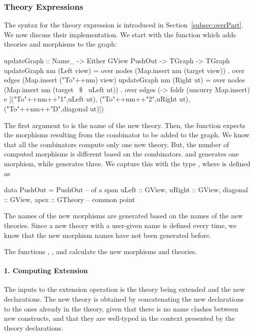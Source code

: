 \subsubsection{Theory Expressions}
The syntax for the theory expression is introduced in Section~\ref{subsec:overPart}. We now discuss their implementation. 
We start with the function  which adds theories and morphisms to the graph:  
\begin{hscode}
updateGraph ::   Name_ -> Either GView PushOut -> TGraph -> TGraph
updateGraph nm (Left view) =
  over nodes (Map.insert nm (target view)) .
  over edges (Map.insert ("To"++nm) view)
updateGraph nm (Right ut) =
  over nodes (Map.insert nm (target ~$\$$~ uLeft ut)) .
  over edges (\e -> foldr (uncurry Map.insert) e 
                        [("To"++nm++"1",uLeft ut),
                         ("To"++nm++"2",uRight ut),
                         ("To"++nm++"D",diagonal ut)])
\end{hscode}
The first argument to  is the name of the new theory. Then, the function expects the morphisms resulting from the combinator to be added to the graph. We know that all the combinators compute only one new theory. 
But, the number of computed morphisms is different based on the combinators.  and  generates one morphism, while  generates three. We capture this with the type , where  is defined as 
\begin{hscode}
data PushOut = PushOut { -- of a span
  uLeft    :: GView,
  uRight   :: GView,
  diagonal :: GView,
  apex     :: GTheory } -- common point
\end{hscode}
The names of the new morphisms are generated based on the names of the new theories. Since a new theory with a user-given name is defined every time, we know that the new morphism names have not been generated before. 

The functions , , and  calculate the new morphisms and theories. 

\paragraph{1. Computing Extension}
The inputs to the extension operation is the theory being extended and the new declarations. The new theory is obtained by concatenating the new declarations to the ones already in the theory, given that there is no name clashes between new constructs, and that they are well-typed in the context presented by the theory declarations. 

